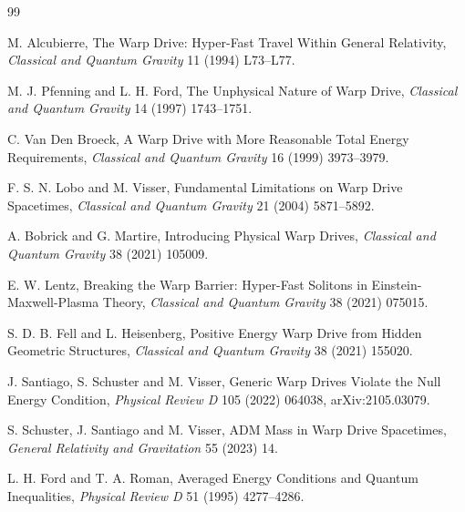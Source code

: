 \documentclass[11pt]{article}
\begin{document}
\begin{thebibliography}{99}

 M. Alcubierre, The Warp Drive: Hyper-Fast Travel Within General Relativity, \emph{Classical and Quantum Gravity} 11 (1994) L73--L77.

 M. J. Pfenning and L. H. Ford, The Unphysical Nature of Warp Drive, \emph{Classical and Quantum Gravity} 14 (1997) 1743--1751.

 C. Van Den Broeck, A Warp Drive with More Reasonable Total Energy Requirements, \emph{Classical and Quantum Gravity} 16 (1999) 3973--3979.

 F. S. N. Lobo and M. Visser, Fundamental Limitations on Warp Drive Spacetimes, \emph{Classical and Quantum Gravity} 21 (2004) 5871--5892.

 A. Bobrick and G. Martire, Introducing Physical Warp Drives, \emph{Classical and Quantum Gravity} 38 (2021) 105009.

 E. W. Lentz, Breaking the Warp Barrier: Hyper-Fast Solitons in Einstein-Maxwell-Plasma Theory, \emph{Classical and Quantum Gravity} 38 (2021) 075015.

 S. D. B. Fell and L. Heisenberg, Positive Energy Warp Drive from Hidden Geometric Structures, \emph{Classical and Quantum Gravity} 38 (2021) 155020.

 J. Santiago, S. Schuster and M. Visser, Generic Warp Drives Violate the Null Energy Condition, \emph{Physical Review D} 105 (2022) 064038, arXiv:2105.03079.

 S. Schuster, J. Santiago and M. Visser, ADM Mass in Warp Drive Spacetimes, \emph{General Relativity and Gravitation} 55 (2023) 14.

 L. H. Ford and T. A. Roman, Averaged Energy Conditions and Quantum Inequalities, \emph{Physical Review D} 51 (1995) 4277--4286.

\end{thebibliography}
\end{document}
